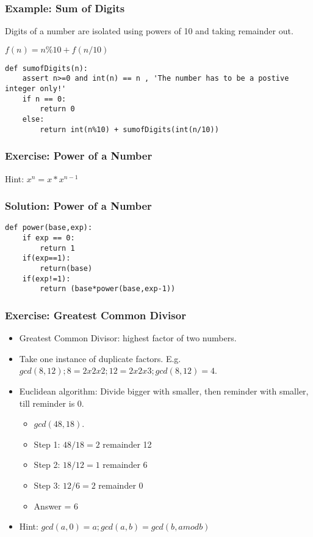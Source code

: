 \begin{frame}[fragile]
	\frametitle{Example: Sum of Digits}

Digits of a number are isolated using powers of 10 and taking remainder out.

$f(n) = n\%10 + f(n/10)$

\begin{lstlisting}
def sumofDigits(n):
    assert n>=0 and int(n) == n , 'The number has to be a postive integer only!'
    if n == 0:
        return 0
    else:
        return int(n%10) + sumofDigits(int(n/10))
\end{lstlisting}


\end{frame}

\begin{frame}[fragile]
	\frametitle{Exercise: Power of a Number}

Hint: $x^n = x * x^{n-1}$



\end{frame}

\begin{frame}[fragile]
	\frametitle{Solution: Power of a Number}

\begin{lstlisting}
def power(base,exp):
    if exp == 0:
        return 1
    if(exp==1):
        return(base)
    if(exp!=1):
        return (base*power(base,exp-1))
\end{lstlisting}


\end{frame}

\begin{frame}[fragile]
	\frametitle{Exercise: Greatest Common Divisor}
		\begin{itemize}
			\item Greatest Common Divisor: highest factor of two numbers. 
			\item Take one instance of duplicate factors. E.g. $gcd(8,12); 8 = 2 x 2 x 2; 12 = 2 x 2 x 3; gcd(8,12) = 4$. 
			\item Euclidean algorithm: Divide bigger with smaller, then reminder with smaller, till reminder is 0.
				\begin{itemize}
					\item $gcd(48,18)$. 
					\item Step 1: $48/18 = 2$ remainder 12
					\item Step 2: $18/12 = 1$ remainder 6
					\item Step 3: $12/6 = 2$ remainder 0
					\item Answer = 6
				\end{itemize}			
			\item Hint: $ gcd(a,0) = a; gcd(a,b) = gcd(b, a mod b)$
		\end{itemize}
\end{frame}

